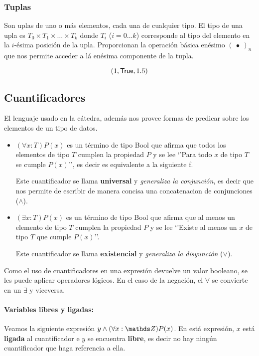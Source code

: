 \subsubsection{Tuplas}
Son uplas de uno o más elementos, cada una de cualquier tipo. El tipo de una upla es $T_0\times T_1\times\dots\times T_k$ donde $T_i$ ($i = 0\dots k$) corresponde al tipo del elemento en la $i$-ésima posición de la upla. Proporcionan la operación básica enésimo $(~\bullet~)_n$ que nos permite acceder a lá enésima componente de la tupla.

$$(1, \mathsf{True}, 1.5)$$
\subsection{Cuantificadores}
El lenguaje usado en la cátedra, además nos provee formas de predicar sobre los elementos de un tipo de datos. 

\begin{itemize}
	\item $(\forall x : T) P(x)$ es un término de tipo Bool que afirma que todos los elementos de tipo $T$ cumplen la propiedad $P$ y se lee `'Para todo $x$ de tipo $T$ se cumple $P(x)$'', es decir es equivalente a la siguiente f.
	
	Este  cuantificador se llama \textbf{universal} y \textit{generaliza la conjunción}, es decir que nos permite de escribir de manera concisa una concatenacion de conjunciones ($\land$).
	\item $(\exists x : T) P(x)$ es un término de tipo Bool que afirma que al menos un elemento de tipo $T$ cumplen la propiedad $P$ y se lee `'Existe al menos un $x$ de tipo $T$ que cumple $P(x)$''.
	
	Este cuantificador se llama \textbf{existencial} y \textit{generaliza la disyunción} ($\lor$).
\end{itemize}

Como el uso de cuantificadores en una expresión  devuelve un valor booleano, se les puede aplicar operadores lógicos. En el caso de la negación, el $\forall$ se convierte en un $\exists$ y viceversa.


\paragraph{Variables libres y ligadas:}

Veamos la siguiente  expresión $y \land (\forall x : \ent) P(x)$. En está expresión, $x$ está \textbf{ligada} al cuantificador e $y$ se encuentra \textbf{libre}, es decir no hay ningún cuantificador que haga referencia a ella.

